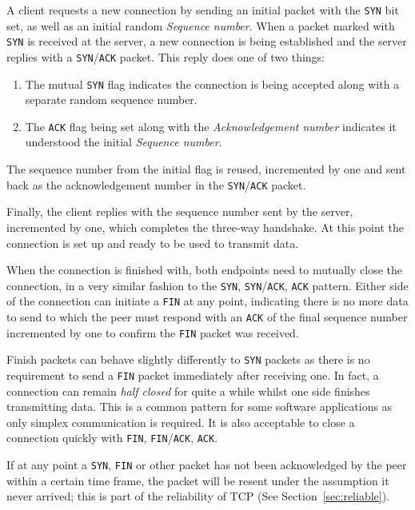         A client requests a new connection by sending an initial packet with the \texttt{SYN} bit set, as well as an initial random \textit{Sequence number}. When a packet marked with \texttt{SYN} is received at the server, a new connection is being established and the server replies with a \texttt{SYN}/\texttt{ACK} packet. This reply does one of two things:
        \begin{enumerate}
            \item The mutual \texttt{SYN} flag indicates the connection is being accepted along with a separate random sequence number.
            \item The \texttt{ACK} flag being set along with the \textit{Acknowledgement number} indicates it understood the initial \textit{Sequence number}.
        \end{enumerate}
        The sequence number from the initial flag is reused, incremented by one and sent back as the acknowledgement number in the \texttt{SYN}/\texttt{ACK} packet.

        Finally, the client replies with the sequence number sent by the server, incremented by one, which completes the three-way handshake. At this point the connection is set up and ready to be used to transmit data.

        When the connection is finished with, both endpoints need to mutually close the connection, in a very similar fashion to the \texttt{SYN}, \texttt{SYN}/\texttt{ACK}, \texttt{ACK} pattern.
        Either side of the connection can initiate a \texttt{FIN} at any point, indicating there is no more data to send to which the peer must respond with an \texttt{ACK} of the final sequence number incremented by one to confirm the \texttt{FIN} packet was received.

        Finish packets can behave slightly differently to \texttt{SYN} packets as there is no requirement to send a \texttt{FIN} packet immediately after receiving one. In fact, a connection can remain \textit{half closed} for quite a while whilst one side finishes transmitting data. This is a common pattern for some software applications as only simplex communication is required. It is also acceptable to close a connection quickly with \texttt{FIN}, \texttt{FIN}/\texttt{ACK}, \texttt{ACK}.

        If at any point a \texttt{SYN}, \texttt{FIN} or other packet has not been acknowledged by the peer within a certain time frame, the packet will be resent under the assumption it never arrived; this is part of the reliability of TCP (See Section~\ref{sec:reliable}).

